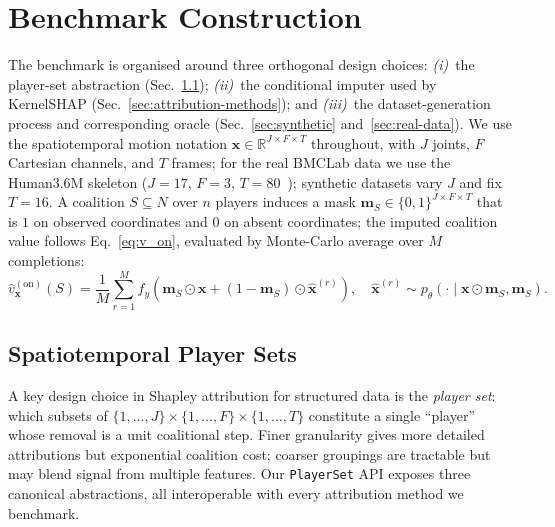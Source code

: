 \section{Benchmark Construction}
\label{sec:method}

The benchmark is organised around three orthogonal design choices:
\emph{(i)}~the player-set abstraction (Sec.~\ref{sec:players});
\emph{(ii)}~the conditional imputer used by KernelSHAP
(Sec.~\ref{sec:attribution-methods}); and
\emph{(iii)}~the dataset-generation process and corresponding oracle
(Sec.~\ref{sec:synthetic} and~\ref{sec:real-data}).
We use the spatiotemporal motion notation
$\mathbf{x} \in \mathbb{R}^{J \times F \times T}$ throughout, with $J$
joints, $F$ Cartesian channels, and $T$ frames; for the real BMCLab data
we use the Human3.6M skeleton ($J{=}17$, $F{=}3$,
$T{=}80$~\citep{ionescu2014human36m}); synthetic datasets vary $J$ and
fix $T{=}16$.  A coalition $S \subseteq N$ over $n$ players induces a
mask $\mathbf{m}_S \in \{0,1\}^{J \times F \times T}$ that is $1$ on
observed coordinates and $0$ on absent coordinates; the imputed
coalition value follows Eq.~\eqref{eq:v_on}, evaluated by Monte-Carlo
average over $M$ completions:
\begin{equation}
  \hat{v}^{(\mathrm{on})}_{\mathbf{x}}(S)
  = \frac{1}{M}\sum_{r=1}^{M}
    f_y\!\left(
      \mathbf{m}_S \odot \mathbf{x}
      + (1 - \mathbf{m}_S) \odot \hat{\mathbf{x}}^{(r)}
    \right),
  \quad
  \hat{\mathbf{x}}^{(r)} \sim p_\theta(\cdot \mid \mathbf{x}\odot\mathbf{m}_S, \mathbf{m}_S).
  \label{eq:vfn_mc}
\end{equation}

\subsection{Spatiotemporal Player Sets}
\label{sec:players}

A key design choice in Shapley attribution for structured data is the
\emph{player set}: which subsets of $\{1,\dots,J\}\!\times\!\{1,\dots,F\}\!\times\!\{1,\dots,T\}$
constitute a single ``player'' whose removal is a unit coalitional step.
Finer granularity gives more detailed attributions but exponential
coalition cost; coarser groupings are tractable but may blend signal from
multiple features.  Our \texttt{PlayerSet} API exposes three canonical
abstractions, all interoperable with every attribution method we benchmark.

